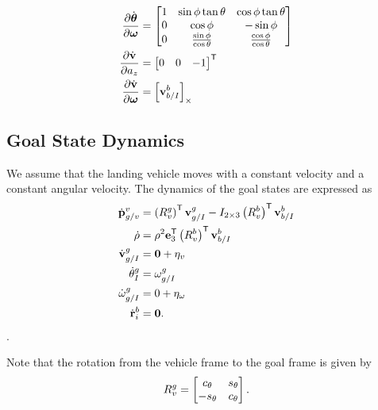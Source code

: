 \begin{align*}
  \frac{\partial \dot{\boldsymbol{\mathrm{\theta}}}}{\partial \boldsymbol{\mathrm{\omega}}} &=
  \begin{bmatrix}
    1 & \sin\phi\tan\theta & \cos\phi\tan\theta \\
    0 & \cos\phi & -\sin\phi \\
    0 & \frac{\sin\phi}{\cos\theta} & \frac{\cos\phi}{\cos\theta}
  \end{bmatrix} \\
  \frac{\partial \dot{\boldsymbol{\mathrm{v}}}}{\partial a_z} &= 
  \begin{bmatrix}
    0 & 0 & -1
  \end{bmatrix}^{\mathsf{T}} \\
  \frac{\partial \dot{\boldsymbol{\mathrm{v}}}}{\partial \boldsymbol{\mathrm{\omega}}} &=
  \left[ \boldsymbol{\mathrm{v}}_{b/I}^b \right]_{\times}
\end{align*}

\subsection{Goal State Dynamics}
We assume that the landing vehicle moves with a constant velocity and a constant
angular velocity. The dynamics of the goal states are expressed as
\begin{align}
  \dot{\boldsymbol{\mathrm{p}}}_{g/v}^{v} &= \left(R_{v}^{g}\right)^{\mathsf{T}}
  \boldsymbol{\mathrm{v}}_{g/I}^{g} - I_{2 \times 3}\left(R_{v}^{b}\right)^{\mathsf{T}} \boldsymbol{\mathrm{v}}_{b/I}^{b} \\
  \dot{\rho} &= \rho^{2} \boldsymbol{\mathrm{e}}_{3}^{\mathsf{T}} \left(R_{v}^{b}\right)^{\mathsf{T}} \boldsymbol{\mathrm{v}}_{b/I}^{b} \\
  \dot{\boldsymbol{\mathrm{v}}}_{g/I}^{g} &= \boldsymbol{\mathrm{0}} + \eta_{v} \\
  \dot{\theta}_{I}^{g} &= \omega_{g/I}^g \\
  \dot{\omega}_{g/I}^{g} &= 0 + \eta_{\omega} \\
  \dot{\boldsymbol{\mathrm{r}}}_{i}^{b} &= \boldsymbol{\mathrm{0}}.
\end{align}.

Note that the rotation from the vehicle frame to the goal frame is given by
\begin{equation}
  R_v^g =
  \begin{bmatrix}
    c_\theta & s_\theta \\
    -s_\theta & c_\theta
  \end{bmatrix}.
\end{equation}

